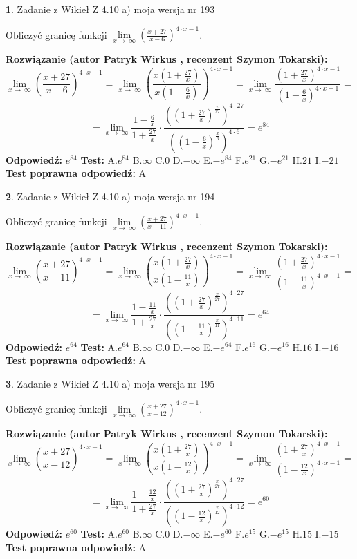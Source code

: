 \documentclass[12pt, a4paper]{article}
\theoremstyle{definition} %
\newtheorem{zad}{}
\newcommand{\zadStart}[1]{\begin{zad}#1\newline}
\newcommand{\zadStop}{\end{zad}}
\newcommand{\rozwStart}[2]{\noindent \textbf{Rozwiązanie (autor #1 , recenzent #2): }\newline}
\newcommand{\rozwStop}{\newline}
\newcommand{\odpStart}{\noindent \textbf{Odpowiedź:}\newline}
\newcommand{\odpStop}{\newline}
\newcommand{\testStart}{\noindent \textbf{Test:}\newline}
\newcommand{\testStop}{\newline}
\newcommand{\kluczStart}{\noindent \textbf{Test poprawna odpowiedź:}\newline}
\newcommand{\kluczStop}{\newline}
\begin{document}
\zadStart{Zadanie z Wikieł Z 4.10 a) moja wersja nr 193}

Obliczyć granicę funkcji  $\lim\limits_{x\to\ \infty}(\frac{x+27}{x-6})^{4\cdot x-1}$.
\zadStop
\rozwStart{Patryk Wirkus}{Szymon Tokarski}
$$\lim\limits_{x\to\ \infty}(\frac{x+27}{x-6})^{4\cdot x-1} = \lim\limits_{x\to\ \infty}(\frac{x(1+\frac{27}{x})}{x(1-\frac{6}{x})})^{4\cdot x-1}=\lim\limits_{x\to\ \infty}\frac{(1+\frac{27}{x})^{4\cdot x-1}}{(1-\frac{6}{x})^{4\cdot x-1}}=$$
$$=\lim\limits_{x\to\ \infty}\frac{1-\frac{6}{x}}{1+\frac{27}{x}}\cdot\frac{((1+\frac{27}{x})^{\frac{x}{27}})^{4\cdot27}}{((1-\frac{6}{x})^{\frac{x}{6}})^{4\cdot6}}=e^{84}$$
\rozwStop
\odpStart
$e^{84}$
\odpStop
\testStart
A.$e^{84}$ B.$\infty$ C.$0$ D.$-\infty$ E.$-e^{84}$
F.$e^{21}$ G.$-e^{21}$
H.$21$
I.$-21$
\testStop
\kluczStart
A
\kluczStop



\zadStart{Zadanie z Wikieł Z 4.10 a) moja wersja nr 194}

Obliczyć granicę funkcji  $\lim\limits_{x\to\ \infty}(\frac{x+27}{x-11})^{4\cdot x-1}$.
\zadStop
\rozwStart{Patryk Wirkus}{Szymon Tokarski}
$$\lim\limits_{x\to\ \infty}(\frac{x+27}{x-11})^{4\cdot x-1} = \lim\limits_{x\to\ \infty}(\frac{x(1+\frac{27}{x})}{x(1-\frac{11}{x})})^{4\cdot x-1}=\lim\limits_{x\to\ \infty}\frac{(1+\frac{27}{x})^{4\cdot x-1}}{(1-\frac{11}{x})^{4\cdot x-1}}=$$
$$=\lim\limits_{x\to\ \infty}\frac{1-\frac{11}{x}}{1+\frac{27}{x}}\cdot\frac{((1+\frac{27}{x})^{\frac{x}{27}})^{4\cdot27}}{((1-\frac{11}{x})^{\frac{x}{11}})^{4\cdot11}}=e^{64}$$
\rozwStop
\odpStart
$e^{64}$
\odpStop
\testStart
A.$e^{64}$ B.$\infty$ C.$0$ D.$-\infty$ E.$-e^{64}$
F.$e^{16}$ G.$-e^{16}$
H.$16$
I.$-16$
\testStop
\kluczStart
A
\kluczStop



\zadStart{Zadanie z Wikieł Z 4.10 a) moja wersja nr 195}

Obliczyć granicę funkcji  $\lim\limits_{x\to\ \infty}(\frac{x+27}{x-12})^{4\cdot x-1}$.
\zadStop
\rozwStart{Patryk Wirkus}{Szymon Tokarski}
$$\lim\limits_{x\to\ \infty}(\frac{x+27}{x-12})^{4\cdot x-1} = \lim\limits_{x\to\ \infty}(\frac{x(1+\frac{27}{x})}{x(1-\frac{12}{x})})^{4\cdot x-1}=\lim\limits_{x\to\ \infty}\frac{(1+\frac{27}{x})^{4\cdot x-1}}{(1-\frac{12}{x})^{4\cdot x-1}}=$$
$$=\lim\limits_{x\to\ \infty}\frac{1-\frac{12}{x}}{1+\frac{27}{x}}\cdot\frac{((1+\frac{27}{x})^{\frac{x}{27}})^{4\cdot27}}{((1-\frac{12}{x})^{\frac{x}{12}})^{4\cdot12}}=e^{60}$$
\rozwStop
\odpStart
$e^{60}$
\odpStop
\testStart
A.$e^{60}$ B.$\infty$ C.$0$ D.$-\infty$ E.$-e^{60}$
F.$e^{15}$ G.$-e^{15}$
H.$15$
I.$-15$
\testStop
\kluczStart
A
\kluczStop
\end{document}
